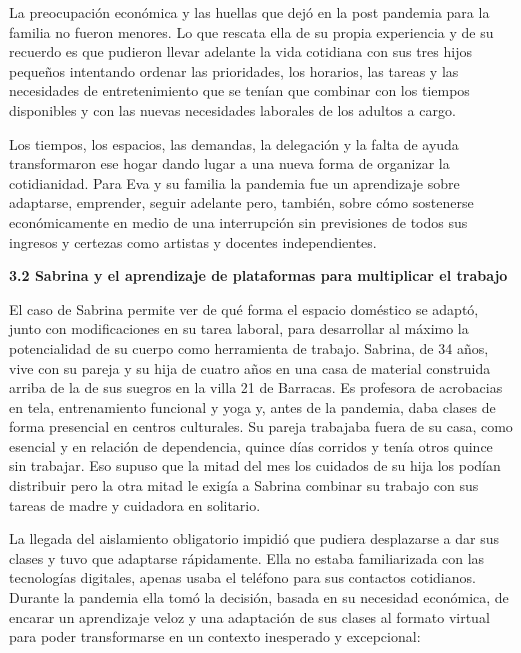 La preocupación económica y las huellas que dejó en la post pandemia para la familia no fueron menores. Lo que rescata ella de su propia experiencia y de su recuerdo es que pudieron llevar adelante la vida cotidiana con sus tres hijos pequeños intentando ordenar las prioridades, los horarios, las tareas y las necesidades de entretenimiento que se tenían que combinar con los tiempos disponibles y con las nuevas necesidades laborales de los adultos a cargo.

Los tiempos, los espacios, las demandas, la delegación y la falta de ayuda transformaron ese hogar dando lugar a una nueva forma de organizar la cotidianidad. Para Eva y su familia la pandemia fue un aprendizaje sobre adaptarse, emprender, seguir adelante pero, también, sobre cómo sostenerse económicamente en medio de una interrupción sin previsiones de todos sus ingresos y certezas como artistas y docentes independientes.

\textbf{3.2 Sabrina y el aprendizaje de plataformas para multiplicar el trabajo}

El caso de Sabrina permite ver de qué forma el espacio doméstico se adaptó, junto con modificaciones en su tarea laboral, para desarrollar al máximo la potencialidad de su cuerpo como herramienta de trabajo. Sabrina, de 34 años, vive con su pareja y su hija de cuatro años en una casa de material construida arriba de la de sus suegros en la villa 21 de Barracas. Es profesora de acrobacias en tela, entrenamiento funcional y yoga y, antes de la pandemia, daba clases de forma presencial en centros culturales. Su pareja trabajaba fuera de su casa, como esencial y en relación de dependencia, quince días corridos y tenía otros quince sin trabajar. Eso supuso que la mitad del mes los cuidados de su hija los podían distribuir pero la otra mitad le exigía a Sabrina combinar su trabajo con sus tareas de madre y cuidadora en solitario.

La llegada del aislamiento obligatorio impidió que pudiera desplazarse a dar sus clases y tuvo que adaptarse rápidamente. Ella no estaba familiarizada con las tecnologías digitales, apenas usaba el teléfono para sus contactos cotidianos. Durante la pandemia ella tomó la decisión, basada en su necesidad económica, de encarar un aprendizaje veloz y una adaptación de sus clases al formato virtual para poder transformarse en un contexto inesperado y excepcional:


